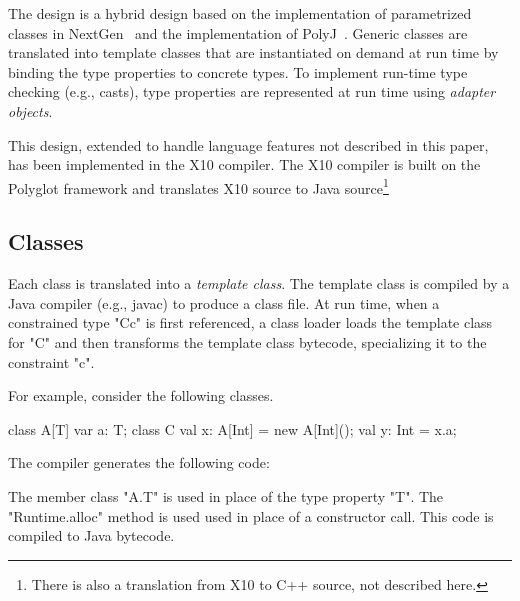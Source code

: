 \documentclass[preprint,nocopyrightspace,9pt]{sigplanconf}
\begin{document}
The design
is a hybrid design based on the implementation of parametrized classes in
NextGen~\cite{allen03,allen04} and the implementation of
PolyJ~\cite{polyj}.
Generic classes are translated into template classes
that are instantiated on demand at run time by binding the type properties
to concrete types.  To implement run-time type checking (e.g.,
casts), type properties are represented at run time
using \emph{adapter objects}.

This design, extended to handle language features
not described in this paper, has been implemented in the X10
compiler.  The X10 compiler is built on the Polyglot framework
and translates X10 source to Java source\footnote{There is also
a translation from X10 to C++ source, not described here.}

\subsection{Classes}

Each class is translated into a \emph{template class}.
The template class is compiled by a Java compiler (e.g., javac)
to produce a class file.
At run time, when a constrained type \xcd"C{c}" is first referenced, a
class loader loads the template class for \xcd"C" and then transforms the
template class bytecode, specializing it to the constraint
\xcd"c".

For example, consider the following classes.
\begin{xten}
class A[T] {
    var a: T;
}
class C {
    val x: A[Int] = new A[Int]();
    val y: Int = x.a;
}
\end{xten}

The compiler generates the following code:

The member class \xcd"A.T" is used in place of the
type property \xcd"T". 
The \xcd"Runtime.alloc" method is used
used in place of a constructor call.
This code is compiled to Java bytecode.
\end{document}
